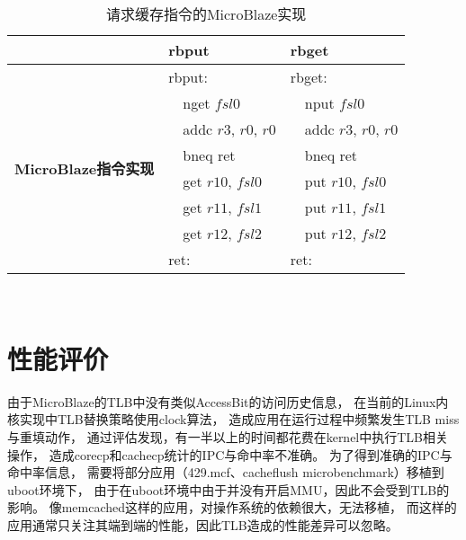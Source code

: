 \begin{table}[tb]
  \centering
  \begin{minipage}[t]{0.6\linewidth}
  \caption{请求缓存指令的MicroBlaze实现}
  \label{tab:pard-dp-isa-impl}
    \begin{tabular*}{\linewidth}{lp{0.5cm}lp{0.5cm}l}
      \toprule[1.5pt]
       & \multicolumn{2}{l}{\textbf{rbput}} & \multicolumn{2}{l}{\textbf{rbget}} \\ 
      \midrule[1pt]

      \multirow{8}{2cm}{\textbf{MicroBlaze指令实现}} & \multicolumn{2}{l}{rbput:}   & \multicolumn{2}{l}{rbget:} \\
                                                   &  & nget $fsl0$                 &  & nput $fsl0$             \\
                                                   &  & addc $r3$, $r0$, $r0$       &  & addc $r3$, $r0$, $r0$   \\
                                                   &  & bneq ret                    &  & bneq ret                \\
                                                   &  & get $r10$, $fsl0$           &  & put $r10$, $fsl0$       \\
                                                   &  & get $r11$, $fsl1$           &  & put $r11$, $fsl1$       \\
                                                   &  & get $r12$, $fsl2$           &  & put $r12$, $fsl2$       \\
                                                   & \multicolumn{2}{l}{ret:}       & \multicolumn{2}{l}{ret:}   \\
      \bottomrule[1.5pt]
    \end{tabular*}\\[2pt]
  \end{minipage}
\end{table}


\section{性能评价}

由于MicroBlaze的TLB中没有类似AccessBit的访问历史信息，
在当前的Linux内核实现中TLB替换策略使用clock算法，
造成应用在运行过程中频繁发生TLB miss与重填动作，
通过评估发现，有一半以上的时间都花费在kernel中执行TLB相关操作，
造成corecp和cachecp统计的IPC与命中率不准确。
为了得到准确的IPC与命中率信息，
需要将部分应用（429.mcf、cacheflush microbenchmark）移植到uboot环境下，
由于在uboot环境中由于并没有开启MMU，因此不会受到TLB的影响。
像memcached这样的应用，对操作系统的依赖很大，无法移植，
而这样的应用通常只关注其端到端的性能，因此TLB造成的性能差异可以忽略。



